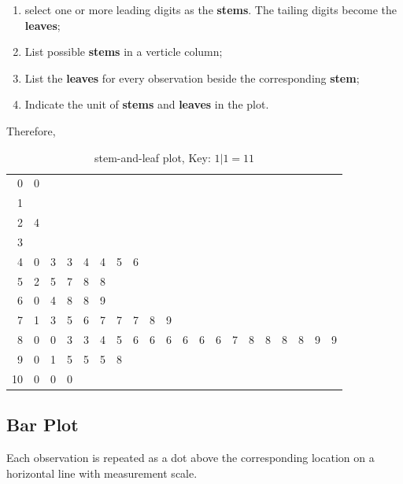 \begin{enumerate}
  \item select one or more leading digits as the \textbf{stems}. The tailing digits become the \textbf{leaves};
  \item List possible \textbf{stems} in a verticle column;
  \item List the \textbf{leaves} for every observation beside the corresponding \textbf{stem};
  \item Indicate the unit of \textbf{stems} and \textbf{leaves} in the plot.
\end{enumerate}

Therefore,
\begin{table}[H]
\centering
\caption{stem-and-leaf plot, Key: $1 | 1= 11$}
\begin{tabular}{r|lllllllllllllllllll}
    0     & 0   \\
    1     \\
    2     & 4   \\
    3     \\
    4     & 0   & 3   & 3   & 4   & 4   & 5   & 6  \\
    5     & 2   & 5   & 7   & 8   & 8  \\
    6     & 0   & 4   & 8   & 8   & 9\\
    7     & 1   & 3   & 5   & 6   & 7   & 7   & 7   & 8   & 9   \\
    8     & 0   & 0   & 3   & 3   & 4   & 5   & 6   & 6   & 6   & 6   & 6   & 6   & 7   & 8   & 8   & 8   & 8   & 9   & 9  \\
    9     & 0   & 1   & 5   & 5   & 5   & 8   \\
    10    & 0   & 0   & 0 \\
\end{tabular}
\end{table}


\subsection{Bar Plot}
Each observation is repeated as a dot above the corresponding location on a horizontal line with measurement scale.

